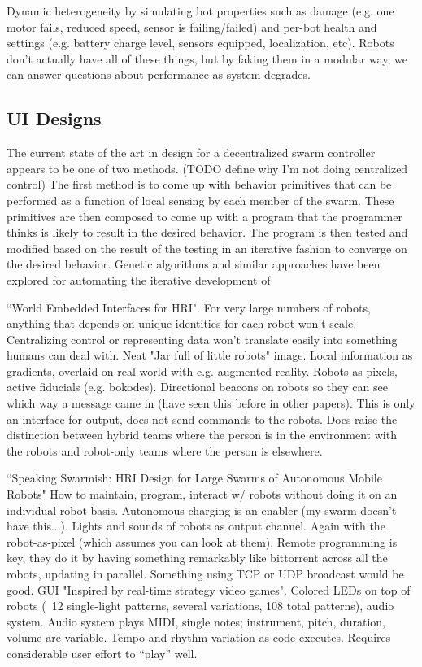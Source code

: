 \documentclass[]{article}
\begin{document}
Dynamic heterogeneity by simulating bot properties such as damage (e.g. one motor fails, reduced speed, sensor is failing/failed) and per-bot health and settings (e.g. battery charge level, sensors equipped, localization, etc).
Robots don't actually have all of these things, but by faking them in a modular way, we can answer questions about performance as system degrades.

\subsection{UI Designs}

The current state of the art in design for a decentralized swarm controller appears to be one of two methods. (TODO define why I'm not doing centralized control)
The first method is to come up with behavior primitives that can be performed as a function of local sensing by each member of the swarm. 
These primitives are then composed to come up with a program that the programmer thinks is likely to result in the desired behavior. 
The program is then tested and modified based on the result of the testing in an iterative fashion to converge on the desired behavior. 
Genetic algorithms and similar approaches have been explored for automating the iterative development of 


``World Embedded Interfaces for HRI". \cite{Daily:2003:WEI:820752.821587} 
 For very large numbers of robots, anything that depends on unique identities for each robot won't scale. Centralizing control or representing data won't translate easily into something humans can deal with. Neat "Jar full of little robots" image. Local information as gradients, overlaid on real-world with e.g. augmented reality. Robots as pixels, active fiducials (e.g. bokodes). Directional beacons on robots so they can see which way a message came in (have seen this before in other papers). This is only an interface for output, does not send commands to the robots. Does raise the distinction between hybrid teams where the person is in the environment with the robots and robot-only teams where the person is elsewhere. 

``Speaking Swarmish: HRI Design for Large Swarms of Autonomous Mobile Robots" \cite{mclurkin2006speaking} How to maintain, program, interact w/ robots without doing it on an individual robot basis. Autonomous charging is an enabler (my swarm doesn't have this...). Lights and sounds of robots as output channel. Again with the robot-as-pixel (which assumes you can look at them). Remote programming is key, they do it by having something remarkably like bittorrent across all the robots, updating in parallel. Something using TCP or UDP broadcast would be good. GUI "Inspired by real-time strategy video games". Colored LEDs on top of robots (~12 single-light patterns, several variations, 108 total patterns), audio system. Audio system plays MIDI, single notes; instrument, pitch, duration, volume are variable. Tempo and rhythm variation as code executes. Requires considerable user effort to ``play'' well. 
\end{document}
